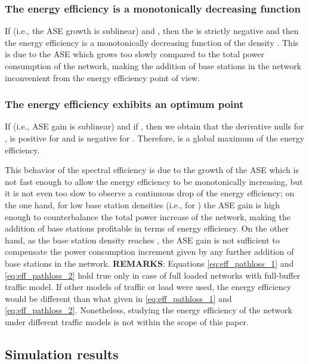 \documentclass[twocoumn]{IEEEtran}
\begin{document}
\subsubsection{The energy efficiency is a monotonically decreasing function}	If  (i.e., the ASE growth is sublinear) and , then the  is strictly negative and then the energy efficiency is a monotonically decreasing function of the density . This is due to the ASE which grows too slowly compared to the total power consumption of the network, making the addition of base stations in the network inconvenient from the energy efficiency point of view.
\subsubsection{The energy efficiency exhibits an optimum point}	
If  (i.e., ASE gain is sublinear) and if , then we obtain that the derivative 
nulls for , is positive for  and is negative for . Therefore,  is a global maximum of the energy efficiency. 

This behavior of the spectral efficiency is due to the growth of the ASE which is not fast enough to allow the energy efficiency to be monotonically increasing, but it is not even too slow to observe a continuous drop of the energy efficiency; on the one hand, for low base station densities  (i.e., for ) the ASE gain is high enough to counterbalance the total power increase of the network, making the addition of base stations profitable in terms of energy efficiency. On the other hand, as the base station density reaches , the ASE gain is not sufficient to compensate the power consumption increment given by any further addition of base stations in the network.
\textbf{REMARKS}: Equations \eqref{eq:eff_pathloss_1} and \eqref{eq:eff_pathloss_2}
hold true only in case of full loaded networks with full-buffer traffic
model. If other models of traffic or load were used, the energy efficiency
would be different than what given in \eqref{eq:eff_pathloss_1} and
\eqref{eq:eff_pathloss_2}. Nonetheless, studying the energy efficiency
of the network under different traffic models is not within the scope
of this paper.

\vspace{-3mm}
\subsection{Simulation results} \label{sub:Energy-efficiency_results}
\end{document}
